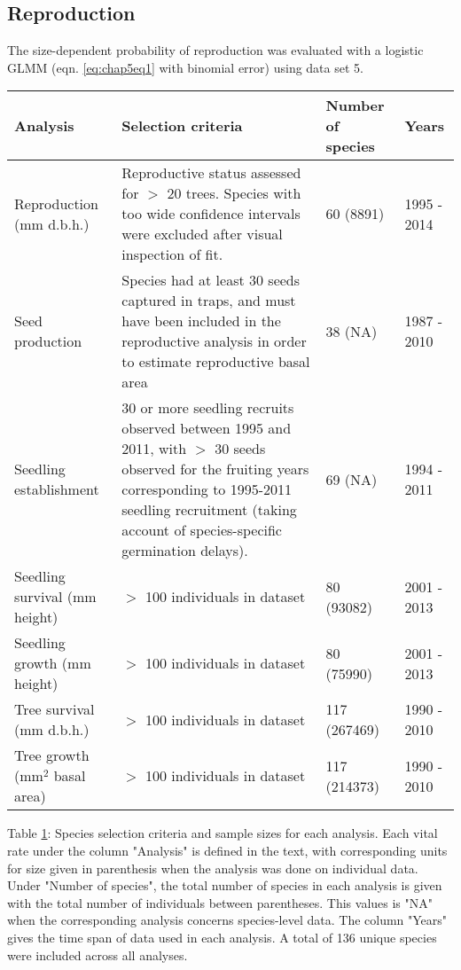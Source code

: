 \documentclass[b5paper,justified]{tufte-book} %
\begin{document}
\begin{fullwidth}
\subsection{Reproduction}
The size-dependent probability of reproduction was evaluated with a logistic GLMM (eqn. \ref{eq:chap5eq1} with binomial error) using data set 5. 


\begin{landscape}
\begin{table}
\begin{center}
\footnotesize
\vspace*{4cm}
\hspace*{4.5cm}
\begin{tabular}{p{5cm}p{8cm}p{2.8cm}p{2cm}}
  \hline
Analysis & Selection criteria & Number of species & Years \\ 
  \hline
Reproduction (mm d.b.h.) & Reproductive status assessed for $>$ 20 trees. Species with too wide confidence intervals were excluded after visual inspection of fit. & 60 (8891) & 1995 - 2014 \\ 
  Seed production & Species had at least 30 seeds captured in traps, and must have been included in the reproductive analysis in order to estimate reproductive basal area & 38 (NA) & 1987 - 2010 \\ 
  Seedling establishment & 30 or more seedling recruits observed between 1995 and 2011, with $>$ 30 seeds observed for the fruiting years corresponding to 1995-2011 seedling recruitment (taking account of species-specific germination delays). & 69 (NA) & 1994 - 2011 \\ 
  Seedling survival (mm height) & $>$ 100 individuals in dataset & 80 (93082) & 2001 - 2013 \\ 
  Seedling growth (mm height) & $>$ 100 individuals in dataset & 80 (75990) & 2001 - 2013 \\ 
  Tree survival (mm d.b.h.) & $>$ 100 individuals in dataset & 117 (267469) & 1990 - 2010 \\ 
  Tree growth (mm$^2$ basal area) & $>$ 100 individuals in dataset & 117 (214373) & 1990 - 2010 \\ 
   \hline
\end{tabular}
\label{tab:chap5tab2}
\hspace*{4.5cm}\begin{minipage}{19.5cm} Table \ref{tab:chap5tab2}: Species selection criteria and sample sizes for each analysis. Each vital rate under the column "Analysis" is defined in the text, with corresponding units for size given in parenthesis when the analysis was done on individual data. Under "Number of species", the total number of species in each analysis is given with the total number of individuals between parentheses. This values is "NA" when the corresponding analysis concerns species-level data. The column "Years" gives the time span of data used in each analysis. A total of 136 unique species were included across all analyses. \end{minipage} 
\end{center}
\end{table}
\end{landscape}


\end{fullwidth}
\end{document}
